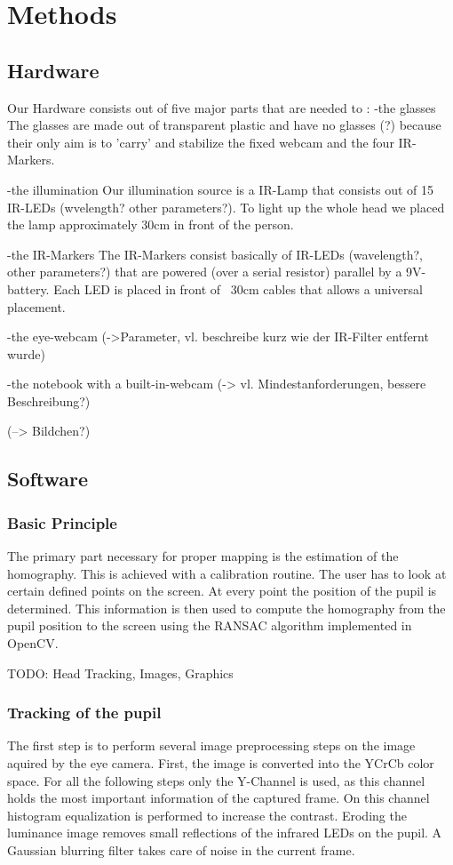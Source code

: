 \section{Methods}\label{methods}

\subsection{Hardware}
Our Hardware consists out of five major parts that are needed to :
-the glasses
The glasses are made out of transparent plastic and have no glasses (?) because their only aim is to 'carry' and stabilize the fixed webcam and the four IR-Markers.

-the illumination
Our illumination source is a IR-Lamp that consists out of 15 IR-LEDs (wvelength? other parameters?). To light up the whole head we placed the lamp approximately 30cm in front of the person.

-the IR-Markers
The IR-Markers consist basically of IR-LEDs (wavelength?, other parameters?) that are powered (over a serial resistor) parallel by a 9V-battery. Each LED is placed in front of ~30cm cables that allows a universal placement. 

-the eye-webcam 
(->Parameter, vl. beschreibe kurz wie der IR-Filter entfernt wurde)

-the notebook with a built-in-webcam 
(-> vl. Mindestanforderungen, bessere Beschreibung?)

(--> Bildchen?)

\subsection{Software}

\subsubsection{Basic Principle}
The primary part necessary for proper mapping is the estimation of the homography. 
This is achieved with a calibration routine. The user has to look at certain defined points on the screen. 
At every point the position of the pupil is determined. 
This information is then used to compute the homography from the pupil position to the screen using the RANSAC algorithm implemented in OpenCV. 

TODO: Head Tracking, Images, Graphics

\subsubsection{Tracking of the pupil}
The first step is to perform several image preprocessing steps on the image aquired by the eye camera. First, the image is converted into the YCrCb color space.
For all the following steps only the Y-Channel is used, as this channel holds the most important information of the captured frame.
On this channel histogram equalization is performed to increase the contrast. 
Eroding the luminance image removes small reflections of the infrared LEDs on the pupil. 
A Gaussian blurring filter takes care of noise in the current frame. 

